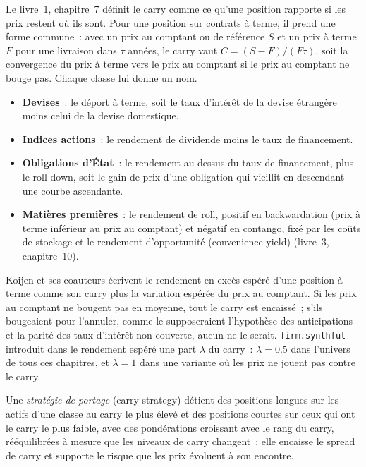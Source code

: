 Le livre~1, chapitre~7 définit le carry comme ce qu'une position rapporte si les prix restent où ils sont. Pour une position sur contrats à terme, il prend une forme commune~: avec un prix au comptant ou
de référence $S$ et un prix à terme $F$ pour une livraison dans $\tau$ années, le carry vaut $C = (S - F)/(F\tau)$, soit la convergence du prix à terme vers le prix au comptant
si le prix au comptant ne bouge pas. Chaque classe lui donne un nom.
\begin{itemize}
\item \textbf{Devises}~: le déport à terme, soit le taux d'intérêt de la devise étrangère moins celui de la devise domestique.
\item \textbf{Indices actions}~: le rendement de dividende moins le taux de financement.
\item \textbf{Obligations d'État}~: le rendement au-dessus du taux de financement, plus le roll-down, soit le gain de prix d'une obligation qui vieillit en descendant une courbe ascendante.
\item \textbf{Matières premières}~: le rendement de roll, positif en backwardation (prix à terme inférieur au prix au comptant) et négatif en contango, fixé par les coûts de stockage et le
rendement d'opportunité (convenience yield) (livre~3, chapitre~10).
\end{itemize}
Koijen et ses coauteurs écrivent le rendement en excès espéré d'une position à terme comme son carry plus la variation espérée du prix au comptant. Si les prix au comptant ne
bougent pas en moyenne, tout le carry est encaissé~; s'ils bougeaient pour l'annuler, comme le supposeraient l'hypothèse des anticipations et la parité des taux d'intérêt non couverte,
aucun ne le serait. \texttt{firm.synthfut} introduit dans le rendement espéré une part $\lambda$ du carry~: $\lambda = 0.5$ dans l'univers de tous ces chapitres, et
$\lambda = 1$ dans une variante où les prix ne jouent pas contre le carry.

\begin{definition}\label{def:s1:carry-across-asset-classes:carry}
Une \emph{stratégie de portage} (carry strategy) détient des positions longues sur les actifs d'une classe au carry le plus élevé et des positions courtes sur ceux qui ont
le carry le plus faible, avec des pondérations croissant avec le rang du carry, rééquilibrées à mesure que les niveaux de carry changent~; elle encaisse le spread de carry et supporte le risque que les prix
évoluent à son encontre.
\end{definition}


